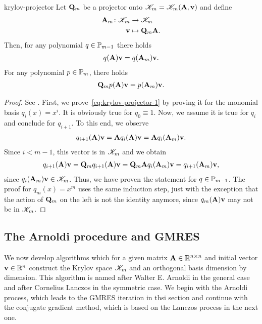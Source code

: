 \begin{Lemma}{krylov-projector}
  Let $\matq_m$ be a projector onto $\krylov_m=\krylov_m(\mata,\vv)$ and define
  \begin{align}
    \mata_m\colon \krylov_m &\to \krylov_m\\
    \vv&\mapsto \matq_m \mata.
  \end{align}
  Then, for any polynomial $q\in\P_{m-1}$ there holds
  \begin{gather}
    \label{eq:krylov-projector-1}
    q(\mata)\vv = q(\mata_m)\vv.
  \end{gather}
  For any polynomial $p\in\P_m$, there holds
  \begin{gather}
    \label{eq:krylov-projector-2}
    \matq_m p(\mata)\vv = p(\mata_m)\vv.
  \end{gather}
\end{Lemma}

\begin{proof}
  See \cite[Proposition 6.3]{Saad00}.  First, we
  prove~\eqref{eq:krylov-projector-1} by proving it for the monomial
  basis $q_i(x) = x^i$. It is obviously true for $q_0\equiv 1$. Now,
  we assume it is true for $q_i$ and conclude for $q_{i+1}$. To this
  end, we observe
  \begin{gather}
    q_{i+1}(\mata)\vv = \mata q_i(\mata)\vv = \mata q_i(\mata_m)\vv.
  \end{gather}
  Since $i<m-1$, this vector is in $\krylov_m$ and we obtain
  \begin{gather}
    q_{i+1}(\mata)\vv
    = \matq_m q_{i+1}(\mata)\vv
    = \matq_m \mata q_i(\mata_m)\vv
    = q_{i+1}(\mata_m)\vv,
  \end{gather}
  since $q_i(\mata_m)\vv\in\krylov_m$. Thus, we have proven the
  statement for $q\in\P_{m-1}$. The proof for $q_{m}(x) = x^m$ uses
  the same induction step, just with the exception that the action of
  $\matq_m$ on the left is not the identity anymore, since
  $q_m(\mata)\vv$ may not be in $\krylov_m$.
\end{proof}

\subsection{The Arnoldi procedure and GMRES}

\begin{intro}
  We now develop algorithms which for a given matrix $\mata\in\Rnn$
  and initial vector $\vv\in\R^n$ construct the Krylov space
  $\krylov_m$ and an orthogonal basis dimension by dimension. This
  algorithm is named after Walter E. Arnoldi in the general case and
  after Cornelius Lanczos in the symmetric case. We begin with the
  Arnoldi process, which leads to the GMRES iteration in thsi section
  and continue with the conjugate gradient method, which is based on
  the Lanczos process in the next one.
\end{intro}

